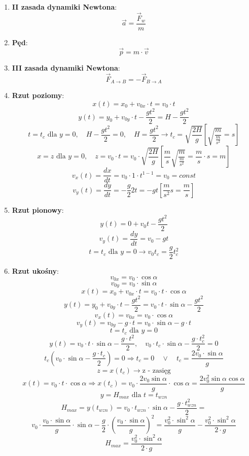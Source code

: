 \documentclass{article}
\begin{document}
\begin{enumerate}
		\item \textbf{II zasada dynamiki Newtona}:
		\[
		\vec{a} = \frac{\vec{F}_w}{m}
		\]
		
		\item \textbf{Pęd}:
		\[
		\vec{p} = m \cdot \vec{v}
		\]
		
		\item \textbf{III zasada dynamiki Newtona}:
		\[
		\vec{F}_{A \to B} = -\vec{F}_{B \to A}
		\]
		
		\item \textbf{Rzut poziomy}:
		\[
		x(t) = x_0 + v_{0x} \cdotp t = v_0 \cdotp t
		\]
		\[
		y(t) = y_0 + v_{0y} \cdotp t - \frac{gt^2}{2} = H - \frac{gt^2}{2}
		\]
		\[
		t = t_c \text{ dla } y = 0, \quad H - \frac{gt^2}{2} = 0, \quad H = \frac{gt^2}{2} \rightarrow t_c = \sqrt{\frac{2H}{g}} \left[ \sqrt{\frac{m}{\frac{m}{s^2}}} = s \right]
		\]
		\[
		x = z \text{ dla } y = 0, \quad z = v_0 \cdotp t = v_0 \cdotp \sqrt{\frac{2H}{g}} \left[ \frac{m}{s} \sqrt{\frac{m}{\frac{m}{s^2}}} = \frac{m}{s} \cdotp s = m \right]
		\]
		\[
		v_x(t) = \frac{dx}{dt} = v_0 \cdotp 1 \cdotp t^{1-1} = v_0 = const
		\]
		\[
		v_y(t) = \frac{dy}{dt} = - \frac{g}{2} 2t = -gt \left[ \frac{m}{s^2}s = \frac{m}{s} \right]
		\]
		
		\item \textbf{Rzut pionowy}:
		\[
		y(t) = 0 + v_0t - \frac{gt^2}{2}
		\]
		\[
		v_y(t) = \frac{dy}{dt} = v_0 - gt
		\]
		\[
		t = t_c \text{ dla } y = 0 \rightarrow v_0t_c = \frac{g}{2} t_c^2
		\]
		
		\item \textbf{Rzut ukośny}:
		\[
		v_{0x} = v_0 \cdotp \cos\alpha
		\]
		\[
		v_{0y} = v_0 \cdotp \sin\alpha
		\]
		\[
		x(t) = x_0 + v_{0x} \cdotp t = v_0 \cdotp t \cdotp \cos\alpha
		\]
		\[
		y(t) = y_0 + v_{0y} \cdotp t - \frac{gt^2}{2} = v_0 \cdotp t \cdotp \sin\alpha - \frac{gt^2}{2}
		\]
		\[
		v_x(t) = v_{0x} = v_0 \cdotp \cos\alpha
		\]
		\[
		v_y(t) = v_{0y} - g \cdotp t = v_0 \cdotp \sin\alpha - g \cdotp t
		\]
		\[
		t = t_c \text{ dla } y = 0
		\]
		\[
		y(t) = v_0 \cdotp t \cdotp \sin\alpha - \frac{g \cdotp t^2}{2}, \quad v_0 \cdotp t_c \cdotp \sin\alpha - \frac{g \cdotp t_c^2}{2} = 0
		\]
		\[
		t_c \left( v_0 \cdotp \sin\alpha - \frac{g \cdotp t_c}{2} \right) = 0 \Rightarrow t_c = 0 \quad \vee \quad t_c = \frac{2v_0 \cdot \sin\alpha}{g}
		\]
		\[
		z = x(t_c) \longrightarrow \text{z - zasięg}
		\]
		\[
		x(t) = v_0 \cdot t \cdotp \cos\alpha \Rightarrow x(t_c) = v_0 \cdotp \frac{2v_0\sin\alpha}{g} \cdotp \cos\alpha = \frac{2v_0^2 \sin\alpha \cos\alpha}{g}
		\]
		\[
		y = H_{max} \text{ dla } t = t_{wzn}
		\]
		\[
		H_{max} = y(t_{wzn}) = v_0 \cdotp t_{wzn} \cdotp \sin\alpha - \frac{g \cdotp t_{wzn}^2}{2} =
		\]
		\[
		 v_0 \cdotp \frac{v_0 \cdotp \sin\alpha}{g} \cdotp \sin\alpha - \frac{g}{2} \cdotp \left( \frac{v_0 \cdotp \sin\alpha}{g} \right)^2 = \frac{v_0^2 \cdotp \sin^2 \alpha}{g} - \frac{v_0^2 \cdotp \sin^2 \alpha}{2 \cdotp g}
		\]
		\[
		H_{max} = \frac{v_0^2 \cdotp \sin^2 \alpha}{2 \cdotp g}
		\]
		

\end{enumerate}
\end{document}
